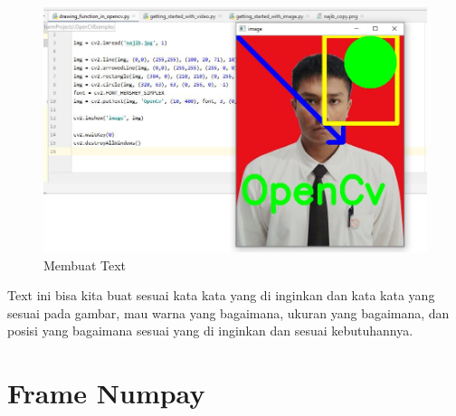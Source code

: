 \begin{figure}[ht]
\centering
\includegraphics[scale=0.5]{figures/2,14.jpg}
\caption{Membuat Text}
\label{contoh}
\end{figure}

Text ini bisa kita buat sesuai kata kata yang di inginkan dan kata kata yang sesuai pada gambar, mau warna yang bagaimana, ukuran yang bagaimana, dan posisi yang bagaimana sesuai yang di inginkan dan sesuai kebutuhannya.

\newpage
\section{Frame Numpay}
